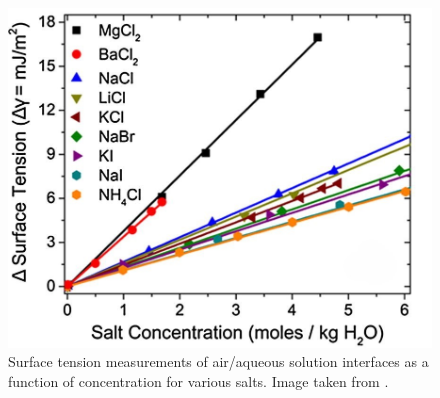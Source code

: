 \begin{figure}[tbhp!]
      \centering
      \includegraphics[width=0.7\linewidth]{images/ST_solute.jpg}
      \caption{Surface tension measurements of air/aqueous solution interfaces as a function of concentration for various salts. Image taken from \cite{okur2017jones}. }
      \label{fig:surf_tens_solute}
\end{figure}